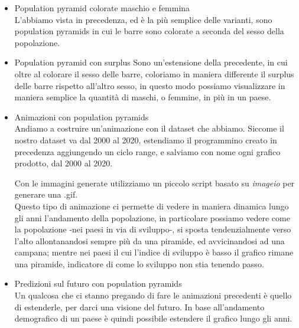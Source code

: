 \documentclass[11pt, oneside]{article}
\begin{document}
\begin{itemize}
\item Population pyramid colorate maschio e femmina\\
L'abbiamo vista in precedenza, ed è la più semplice delle varianti, sono population pyramids in cui le barre sono colorate a seconda del sesso della popolazione.
\item Population pyramid con surplus
Sono un'estensione della precedente, in cui oltre al colorare il sesso delle barre, coloriamo in maniera differente il surplus delle barre rispetto all'altro sesso, in questo modo possiamo visualizzare in maniera semplice la quantità di maschi, o femmine, in più in un paese.
\begin{center}
\end{center}
\item Animazioni con population pyramids\\
Andiamo a costruire un'animazione con il dataset che abbiamo.
Siccome il nostro dataset va dal 2000 al 2020, estendiamo il programmino creato in precedenza aggiungendo un ciclo range, e salviamo con nome ogni grafico prodotto, dal 2000 al 2020.

\begin{center}


\end{center}
Con le immagini generate utilizziamo un piccolo script basato su \emph{imageio} per generare una .gif.\\
Questo tipo di animazione ci permette di vedere in maniera dinamica lungo gli anni l'andamento della popolazione, in particolare possiamo vedere come la popolazione -nei paesi in via di sviluppo-, si sposta tendenzialmente verso l'alto allontanandosi sempre più da una piramide, ed avvicinandosi ad una campana; mentre nei paesi il cui l'indice di sviluppo è basso il grafico rimane una piramide, indicatore di come lo sviluppo non stia tenendo passo.

\item Predizioni sul futuro con population pyramids\\
Un qualcosa che ci stanno pregando di fare le animazioni precedenti è quello di estenderle, per darci una visione del futuro. In base all'andamento demografico di un paese è quindi possibile estendere il grafico lungo gli anni.

\end{itemize}
\end{document}
